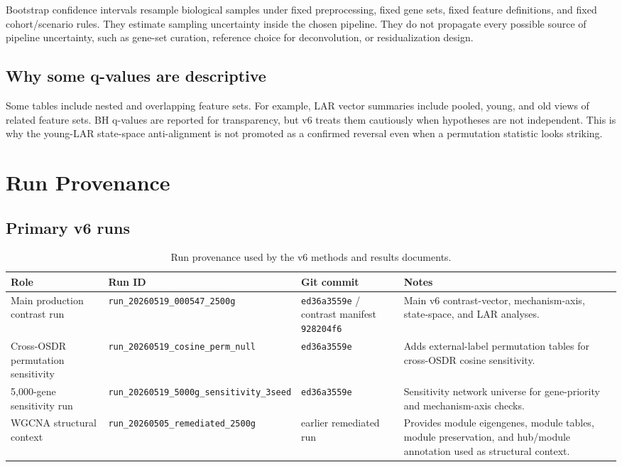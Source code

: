 \documentclass[11pt]{article}
\newcommand{\code}[1]{\texttt{#1}}
\begin{document}
Bootstrap confidence intervals resample biological samples under fixed preprocessing, fixed gene sets, fixed feature definitions, and fixed cohort/scenario rules. They estimate sampling uncertainty inside the chosen pipeline. They do not propagate every possible source of pipeline uncertainty, such as gene-set curation, reference choice for deconvolution, or residualization design.

\subsection{Why some q-values are descriptive}

Some tables include nested and overlapping feature sets. For example, LAR vector summaries include pooled, young, and old views of related feature sets. BH q-values are reported for transparency, but v6 treats them cautiously when hypotheses are not independent. This is why the young-LAR state-space anti-alignment is not promoted as a confirmed reversal even when a permutation statistic looks striking.

\section{Run Provenance}

\subsection{Primary v6 runs}

\begin{table}[H]
\centering\small
\begin{tabularx}{\textwidth}{p{}p{}p{}X}
\toprule
Role & Run ID & Git commit & Notes \\
\midrule
Main production contrast run & \code{run\_20260519\_000547\_2500g} & \code{ed36a3559e} / contrast manifest \code{928204f6} & Main v6 contrast-vector, mechanism-axis, state-space, and LAR analyses. \\
Cross-OSDR permutation sensitivity & \code{run\_20260519\_cosine\_perm\_null} & \code{ed36a3559e} & Adds external-label permutation tables for cross-OSDR cosine sensitivity. \\
5,000-gene sensitivity run & \code{run\_20260519\_5000g\_sensitivity\_3seed} & \code{ed36a3559e} & Sensitivity network universe for gene-priority and mechanism-axis checks. \\
WGCNA structural context & \code{run\_20260505\_remediated\_2500g} & earlier remediated run & Provides module eigengenes, module tables, module preservation, and hub/module annotation used as structural context. \\
\bottomrule
\end{tabularx}
\caption{Run provenance used by the v6 methods and results documents.}
\end{table}
\end{document}
